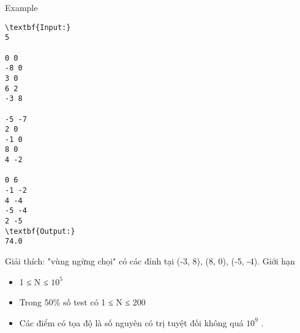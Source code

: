Example  
\begin{verbatim}
\textbf{Input:}
5

0 0
-8 0
3 0
6 2
-3 8

-5 -7
2 0
-1 0
8 0
4 -2

0 6
-1 -2
4 -4
-5 -4
2 -5
\textbf{Output:}
74.0\end{verbatim}

Giải thích: "vùng ngừng chọi" có các đỉnh tại (-3, 8), (8, 0), (-5, -4).
   Giới hạn  
\begin{itemize}
	\item     1 ≤ N ≤ $10^{5}$
	\item     Trong 50\% số test có 1 ≤ N ≤ 200   
	\item     Các điểm có tọa độ là số nguyên có trị tuyệt đối không quá $10^{9}$    .   
\end{itemize}